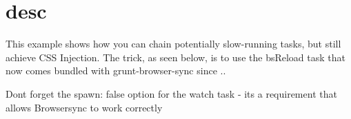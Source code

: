 \chapter{desc}
\hypertarget{md__d_1_2_g_i_t_2_food_link_2foodlink_8client_2node__modules_2bs-recipes_2recipes_2grunt_8sass_8autoprefixer_2desc}{}\label{md__d_1_2_g_i_t_2_food_link_2foodlink_8client_2node__modules_2bs-recipes_2recipes_2grunt_8sass_8autoprefixer_2desc}
This example shows how you can chain potentially slow-\/running tasks, but still achieve CSS Injection. The trick, as seen below, is to use the {\ttfamily bs\+Reload} task that now comes bundled with {\ttfamily grunt-\/browser-\/sync} since {..}

Don\textquotesingle{}t forget the {\ttfamily spawn\+: false} option for the watch task -\/ it\textquotesingle{}s a requirement that allows Browsersync to work correctly


\begin{DoxyCode}{0}
\DoxyCodeLine{\ \ \ \ \},}
\DoxyCodeLine{\},}

\end{DoxyCode}
 